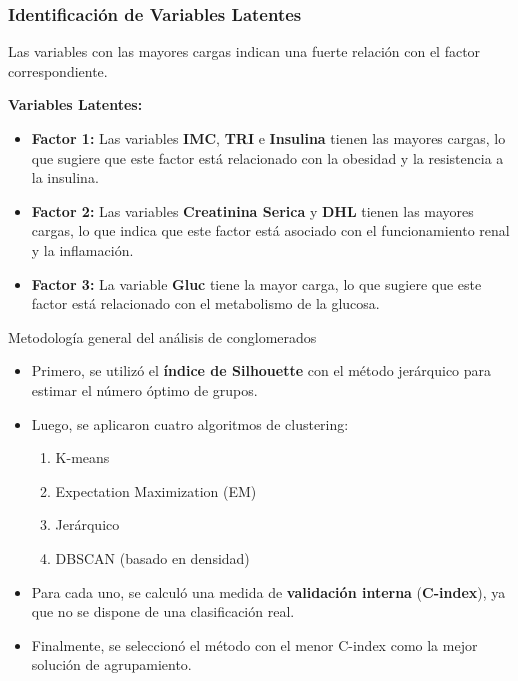 \documentclass[
	11pt, %
]{beamer}
\begin{document}
\begin{frame}
\frametitle{Identificación de Variables Latentes}

Las variables con las mayores cargas indican una fuerte relación con el factor correspondiente.

\vspace{0.4cm}

\textbf{Variables Latentes:}

\begin{itemize}
    \item \textbf{Factor 1:} Las variables \textbf{IMC}, \textbf{TRI} e \textbf{Insulina} tienen las mayores cargas, lo que sugiere que este factor está relacionado con la obesidad y la resistencia a la insulina.
    \item \textbf{Factor 2:} Las variables \textbf{Creatinina Serica} y \textbf{DHL} tienen las mayores cargas, lo que indica que este factor está asociado con el funcionamiento renal y la inflamación.
    \item \textbf{Factor 3:} La variable \textbf{Gluc} tiene la mayor carga, lo que sugiere que este factor está relacionado con el metabolismo de la glucosa.
\end{itemize}

\end{frame}


\begin{frame}{Metodología general del análisis de conglomerados}
    \begin{itemize}
        \item Primero, se utilizó el \textbf{índice de Silhouette} con el método jerárquico para estimar el número óptimo de grupos. 
        
        \item Luego, se aplicaron cuatro algoritmos de clustering:
        \begin{enumerate}
            \item K-means
            \item Expectation Maximization (EM)
            \item Jerárquico
            \item DBSCAN (basado en densidad)
        \end{enumerate}
        
        \item Para cada uno, se calculó una medida de \textbf{validación interna} (\textbf{C-index}), ya que no se dispone de una clasificación real.
        
        \item Finalmente, se seleccionó el método con el menor C-index como la mejor solución de agrupamiento.
    \end{itemize}
\end{frame}
\end{document}
